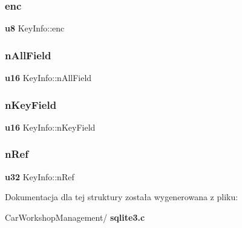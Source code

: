 \mbox{\label{struct_key_info_a37972825f9a148668e979be12465e832}} 
\subsubsection{enc}
{\footnotesize\ttfamily \textbf{ u8} Key\+Info\+::enc}

\mbox{\label{struct_key_info_ac9860ac498758b52093ea50ccf150ec4}} 
\subsubsection{nAllField}
{\footnotesize\ttfamily \textbf{ u16} Key\+Info\+::n\+All\+Field}

\mbox{\label{struct_key_info_a44bf8a06d747dc506b54c3ce6c6cc6d1}} 
\subsubsection{nKeyField}
{\footnotesize\ttfamily \textbf{ u16} Key\+Info\+::n\+Key\+Field}

\mbox{\label{struct_key_info_a4f6162c8d1ecc9e3c7471571e8918972}} 
\subsubsection{nRef}
{\footnotesize\ttfamily \textbf{ u32} Key\+Info\+::n\+Ref}



Dokumentacja dla tej struktury została wygenerowana z pliku\+:\begin{DoxyCompactItemize}
\item 
Car\+Workshop\+Management/\textbf{ sqlite3.\+c}\end{DoxyCompactItemize}
